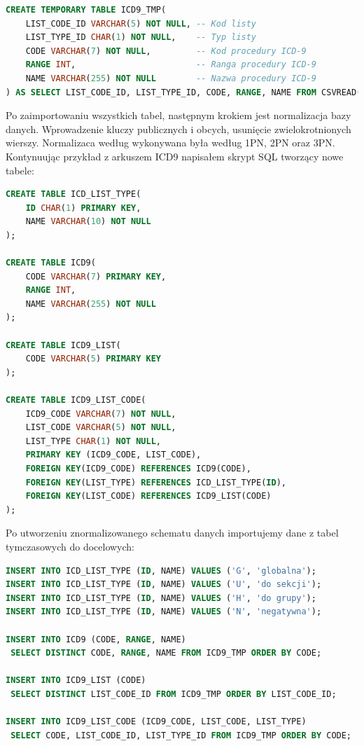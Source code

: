 \begin{lstlisting}[language=SQL]
CREATE TEMPORARY TABLE ICD9_TMP(
    LIST_CODE_ID VARCHAR(5) NOT NULL, -- Kod listy
    LIST_TYPE_ID CHAR(1) NOT NULL,    -- Typ listy
    CODE VARCHAR(7) NOT NULL,         -- Kod procedury ICD-9
    RANGE INT,                        -- Ranga procedury ICD-9
    NAME VARCHAR(255) NOT NULL        -- Nazwa procedury ICD-9
) AS SELECT LIST_CODE_ID, LIST_TYPE_ID, CODE, RANGE, NAME FROM CSVREAD('icd9.csv');
\end{lstlisting}

Po zaimportowaniu wszystkich tabel, następnym krokiem jest normalizacja bazy danych. Wprowadzenie kluczy publicznych i obcych, usunięcie zwielokrotnionych wierszy. Normalizaca według wykonywana była według 1PN, 2PN oraz 3PN. Kontynuując przykład z arkuszem ICD9 napisałem skrypt SQL tworzący nowe tabele:
\newpage
\begin{lstlisting}[language=SQL]
CREATE TABLE ICD_LIST_TYPE(
    ID CHAR(1) PRIMARY KEY,
    NAME VARCHAR(10) NOT NULL
);

CREATE TABLE ICD9(
    CODE VARCHAR(7) PRIMARY KEY,
    RANGE INT,
    NAME VARCHAR(255) NOT NULL
);

CREATE TABLE ICD9_LIST(
    CODE VARCHAR(5) PRIMARY KEY
);

CREATE TABLE ICD9_LIST_CODE(
    ICD9_CODE VARCHAR(7) NOT NULL,
    LIST_CODE VARCHAR(5) NOT NULL,
    LIST_TYPE CHAR(1) NOT NULL,
    PRIMARY KEY (ICD9_CODE, LIST_CODE),
    FOREIGN KEY(ICD9_CODE) REFERENCES ICD9(CODE),
    FOREIGN KEY(LIST_TYPE) REFERENCES ICD_LIST_TYPE(ID),
    FOREIGN KEY(LIST_CODE) REFERENCES ICD9_LIST(CODE)
);
\end{lstlisting}

Po utworzeniu znormalizowanego schematu danych importujemy dane z tabel tymczasowych do docelowych:

\begin{lstlisting}[language=SQL]
INSERT INTO ICD_LIST_TYPE (ID, NAME) VALUES ('G', 'globalna');
INSERT INTO ICD_LIST_TYPE (ID, NAME) VALUES ('U', 'do sekcji');
INSERT INTO ICD_LIST_TYPE (ID, NAME) VALUES ('H', 'do grupy');
INSERT INTO ICD_LIST_TYPE (ID, NAME) VALUES ('N', 'negatywna');

INSERT INTO ICD9 (CODE, RANGE, NAME)
 SELECT DISTINCT CODE, RANGE, NAME FROM ICD9_TMP ORDER BY CODE;

INSERT INTO ICD9_LIST (CODE)
 SELECT DISTINCT LIST_CODE_ID FROM ICD9_TMP ORDER BY LIST_CODE_ID;

INSERT INTO ICD9_LIST_CODE (ICD9_CODE, LIST_CODE, LIST_TYPE)
 SELECT CODE, LIST_CODE_ID, LIST_TYPE_ID FROM ICD9_TMP ORDER BY CODE;
\end{lstlisting}

